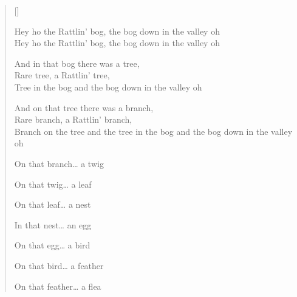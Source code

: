 \pagebreak
\settowidth{\versewidth}{Hey ho the Rattlin' bog the bog down in the valley oh}
\begin{verse}[\versewidth]
\\
\begin{chorus}
Hey ho the Rattlin' bog, the bog down in the valley oh\\
Hey ho the Rattlin' bog, the bog down in the valley oh
\end{chorus}

\begin{patverse}
And in that bog there was a tree,\\
Rare tree, a Rattlin' tree,\\
Tree in the bog and the bog down in the valley oh
\end{patverse}

\begin{patverse}
And on that tree there was a branch,\\
Rare branch, a Rattlin' branch,\\
Branch on the tree and the tree in the bog and the bog down in the valley oh
\end{patverse}

On that branch\dots{} a twig

On that twig\dots{} a leaf

On that leaf\dots{} a nest

In that nest\dots{} an egg

On that egg\dots{} a bird

On that bird\dots{} a feather

On that feather\dots{} a flea
\end{verse}
